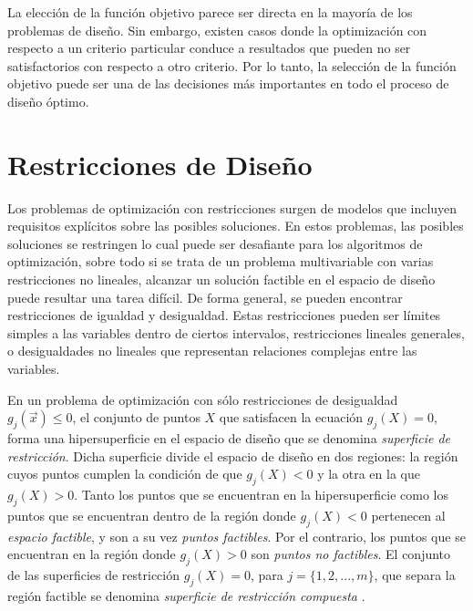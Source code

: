 La elección de la función objetivo parece ser directa en la mayoría de los problemas de diseño. Sin embargo, existen casos donde la optimización con respecto a un criterio particular conduce a resultados que pueden no ser satisfactorios con respecto a otro criterio. Por lo tanto, la selección de la función objetivo puede ser una de las decisiones más importantes en todo el proceso de diseño óptimo. 

\section{Restricciones de Diseño}
Los problemas de optimización con restricciones surgen de modelos que incluyen requisitos explícitos sobre las posibles soluciones. En estos problemas, las posibles soluciones se restringen lo cual puede ser desafiante para los algoritmos de optimización, sobre todo si se trata de un problema multivariable con varias restricciones no lineales, alcanzar un solución factible en el espacio de diseño puede resultar una tarea difícil. De forma general, se pueden encontrar restricciones de igualdad y desigualdad. Estas restricciones pueden ser límites simples a las variables dentro de ciertos intervalos, restricciones lineales generales, o desigualdades no lineales que representan relaciones complejas entre las variables. 

En un problema de optimización con sólo restricciones de desigualdad $g_j (\vec{x}) \leq 0$, el conjunto de puntos $X$ que satisfacen la ecuación $g_j (X) = 0$, forma una hipersuperficie en el espacio de diseño que se denomina \textit{superficie de restricción}. Dicha superficie  divide el espacio de diseño en dos regiones: la región cuyos  puntos cumplen la condición de que $g_j (X) <0$ y la otra en la que $g_j (X)> 0$. Tanto los puntos que se encuentran en la hipersuperficie como los puntos que se encuentran dentro de la región donde $g_j (X) <0$  pertenecen al \textit{espacio factible}, y son a su vez \textit{puntos factibles}. Por el contrario, los puntos que se encuentran en la región donde $g_j (X)> 0$ son \textit{puntos no factibles}. El conjunto de las superficies de restricción $g_j (X) = 0$, para $j = \{1,2, ..., m\}$, que separa la región factible se denomina \textit{superficie de restricción compuesta} \cite{rao_engineering_2009}.

